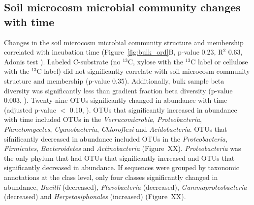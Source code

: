 \subsection{Soil microcosm microbial community changes with time}
Changes in the soil microcosm microbial community structure and membership
correlated with incubation time (Figure~\ref{fig:bulk_ord}B, p-value 0.23,
R$^{2}$ 0.63, Adonis test \citet{Anderson2001a}). Labeled C-substrate (no
$^{13}$C, xylose with the $^{13}$C label or cellulose with the
$^{13}$C label) did not significantly correlate with soil microcosm community
structure and membership (p-value 0.35). Additionally, bulk sample beta
diversity was significantly less than gradient fraction beta diversity (p-value
0.003, \citet{Anderson2006}). Twenty-nine OTUs significantly changed in
abundance with time (adjusted p-value $<$ 0.10, \citet{YBenjamini1995}). OTUs
that significantly increased in abundance with time included OTUs in the
\textit{Verrucomicrobia}, \textit{Proteobacteria}, \textit{Planctomycetes},
\textit{Cyanobacteria}, \textit{Chloroflexi} and \textit{Acidobacteria}. OTUs
that sifnificantly decreased in abundance included OTUs in the
\textit{Proteobacteria}, \textit{Firmicutes}, \textit{Bacteroidetes} and
\textit{Actinobacteria} (Figure~XX).  \textit{Proteobacteria} was the only
phylum that had OTUs that significantly increased and OTUs that significantly
decreased in abundance. If sequences were grouped by taxonomic annotations at
the class level, only four classes significantly changed in abundance,
\textit{Bacilli} (decreased), \textit{Flavobacteria} (decreased),
\textit{Gammaproteobacteria} (decreased) and \textit{Herpetosiphonales}
(increased) (Figure~XX). 
